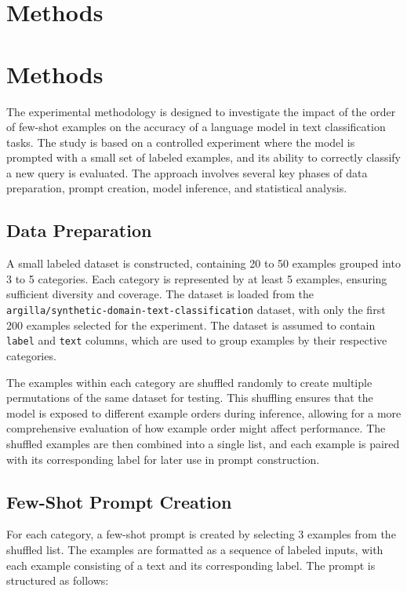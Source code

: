 \documentclass{article}
\begin{document}
\section{Methods}
\section*{Methods}

The experimental methodology is designed to investigate the impact of the order of few-shot examples on the accuracy of a language model in text classification tasks. The study is based on a controlled experiment where the model is prompted with a small set of labeled examples, and its ability to correctly classify a new query is evaluated. The approach involves several key phases of data preparation, prompt creation, model inference, and statistical analysis.

\subsection*{Data Preparation}

A small labeled dataset is constructed, containing 20 to 50 examples grouped into 3 to 5 categories. Each category is represented by at least 5 examples, ensuring sufficient diversity and coverage. The dataset is loaded from the \texttt{argilla/synthetic-domain-text-classification} dataset, with only the first 200 examples selected for the experiment. The dataset is assumed to contain \texttt{label} and \texttt{text} columns, which are used to group examples by their respective categories.

The examples within each category are shuffled randomly to create multiple permutations of the same dataset for testing. This shuffling ensures that the model is exposed to different example orders during inference, allowing for a more comprehensive evaluation of how example order might affect performance. The shuffled examples are then combined into a single list, and each example is paired with its corresponding label for later use in prompt construction.

\subsection*{Few-Shot Prompt Creation}

For each category, a few-shot prompt is created by selecting 3 examples from the shuffled list. The examples are formatted as a sequence of labeled inputs, with each example consisting of a text and its corresponding label. The prompt is structured as follows:
\end{document}
